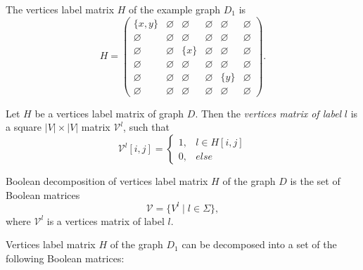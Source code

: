 The vertices label matrix $H$ of the example graph $D_1$ is
$$
    H =
    \begin{pmatrix}
    \{x, y\}        & \varnothing     &   \varnothing      &   \varnothing   &   \varnothing   &    \varnothing  \\
    \varnothing     &   \varnothing   & \varnothing        &   \varnothing   & \varnothing     & \varnothing     \\
    \varnothing     &   \varnothing   &   \{x\}            &   \varnothing   & \varnothing     &   \varnothing   \\
    \varnothing     &   \varnothing   & \varnothing        &   \varnothing   &   \varnothing   &   \varnothing   \\
    \varnothing     &   \varnothing   &   \varnothing      &    \varnothing  &   \{y\}         & \varnothing     \\
    \varnothing     & \varnothing     &   \varnothing      &   \varnothing   & \varnothing     &   \varnothing
    \end{pmatrix}.
$$


\begin{definition}
Let $H$ be a vertices label matrix of graph $D$. Then the \emph{vertices matrix of label} $l$ is a square $|V|\times|V|$ matrix $\mathcal{V}^l$, such that
\begin{equation*}
\mathcal{V}^l[i,j] = 
  \begin{cases}
    1,  & l \in H[i, j] \\
    0,  & else
  \end{cases}
\end{equation*}
\end{definition}

\begin{definition}
Boolean decomposition of vertices label matrix $H$ of the graph $D$ is the set of Boolean matrices
$$\mathcal{V} = \{V^l \mid l \in \Sigma\},$$
where $\mathcal{V}^l$ is a vertices matrix of label $l$.
\end{definition}

Vertices label matrix $H$ of the graph $D_1$ can be decomposed into a set of the following Boolean matrices:

